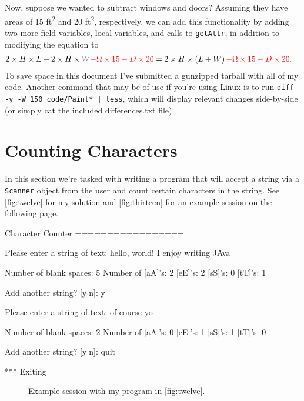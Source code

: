 \documentclass[leqno, 11pt]{article}
\begin{document}
Now, suppose we wanted to subtract windows and doors? Assuming they have areas of 15 \si{ft^{2}} and 20 \si{ft^{2}}, respectively, we can add this functionality by adding two more field variables, local variables, and calls to \texttt{getAttr}, in addition to modifying the equation to
\begin{align}
  2\times H\times L + 2\times H\times W \color{red}{- \Omega\times 15 - D\times 20}&=2\times H\times\left(L + W\right)\color{red}{- \Omega\times 15 - D\times 20}.\notag
\end{align}
To save space in this document I've submitted a gunzipped tarball with all of my code. Another command that may be of use if you're using Linux is to run \texttt{diff -y -W 150 code/Paint* | less}, which  will display relevant changes side-by-side (or simply cat the included differences.txt file).
\section*{Counting Characters}
In this section we're tasked with writing a program that will accept a string via a \texttt{Scanner} object from the user and count certain characters in the string. See \autoref{fig:twelve} for my solution and \autoref{fig:thirteen} for an example session on the following page.
\begin{verbbox}[\mbox{}\scriptsize]
Character Counter
=================

Please enter a string of text: hello, world! I enjoy writing JAva

Number of blank spaces: 5
Number of [aA]'s: 2
          [eE]'s: 2
          [sS]'s: 0
          [tT]'s: 1

Add another string? [y|n]: y

Please enter a string of text: of course yo

Number of blank spaces: 2
Number of [aA]'s: 0
          [eE]'s: 1
          [sS]'s: 1
          [tT]'s: 0

Add another string? [y|n]: quit

*** Exiting
\end{verbbox}
\begin{figure}[t!]
  \centering
  \theverbbox
  \caption{Example session with my program in \autoref{fig:twelve}.}
  \label{fig:thirteen}
\end{figure}
\end{document}
